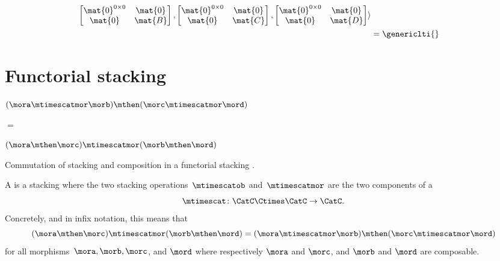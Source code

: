 \begin{example}
\begin{equation*}
\begin{aligned}
            \begin{bmatrix}\mat{0}^{0\times 0}&\mat{0}\\\mat{0}&\mat{B}\end{bmatrix},
            \begin{bmatrix}\mat{0}^{0\times 0}&\mat{0}\\\mat{0}&\mat{C}\end{bmatrix},
            \begin{bmatrix}\mat{0}^{0\times 0}&\mat{0}\\\mat{0}&\mat{D}\end{bmatrix}\rangle \\
                                                 & =\genericlti{}
        \end{aligned}
    \end{equation*}
\end{example}


\section{Functorial stacking}
\label{sec:functorial-stacking}

\begin{marginfigure}
    \centering
    $(\mora \mtimescatmor \morb )
        \mthen (\morc \mtimescatmor \mord )$

    \vspace{3mm}

    $=$

    \vspace{3mm}
    \vspace{3mm}
    $(\mora \mthen \morc ) \mtimescatmor (\morb \mthen \mord )$

    \caption{Commutation of stacking and composition in a functorial stacking . }
    \label{fig:stacking-functorial}
\end{marginfigure}

\begin{ctdefinition}
    \label{def:functorial-stacking-semi-cat}
    A  is a stacking  where the two stacking operations~$\mtimescatob$ and~$\mtimescatmor$ are the two components of a  \begin{equation}
        \mtimescat\colon \CatC \Ctimes \CatC \to \CatC.
    \end{equation}
    Concretely, and in infix notation, this means that
    \begin{equation}
        (\mora \mthen \morc )
        \mtimescatmor (\morb \mthen \mord )
        =
        (\mora \mtimescatmor \morb )
        \mthen (\morc \mtimescatmor \mord )
    \end{equation}
    for all morphisms~$\mora, \morb, \morc$, and $\mord$ where respectively $\mora$ and $\morc$, and $\morb$ and $\mord$ are composable.
\end{ctdefinition}

